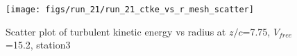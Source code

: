 \begin{figure}[H]
\centering
\texttt{[image: figs/run\_21/run\_21\_ctke\_vs\_r\_mesh\_scatter]}
\caption{Scatter plot of turbulent kinetic energy vs radius at $z/c$=7.75, $V_{free}$=15.2, station3}
\label{fig:run_21_ctke_vs_r_mesh_scatter}
\end{figure}


